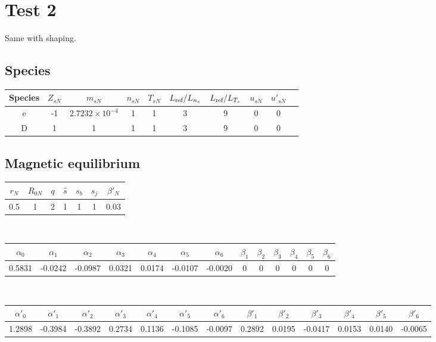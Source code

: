 \documentclass[fleqn]{report}
\begin{document}
\section{Test 2}
Same with shaping.

\subsection{Species}
\begin{tabular}{c c c c c c c c c c}
\hline
Species & $Z_{sN}$ & $m_{sN}$ & $n_{sN}$ & $T_{sN}$ & $L_{\textrm{ref}}/L_{n_s}$ & $L_{\textrm{ref}}/L_{T_s}$ & $u_{sN}$ & $u'_{sN}$ \\ [0.5ex]
\hline
e & -1 & $2.7232\times10^{-4}$ & 1 & 1 & 3 & 9 & 0 & 0 \\ [0.5ex]
\hline 
D &  1 & 1 & 1 & 1 & 3 & 9 & 0 & 0 \\ [0.5ex]
\hline
\end{tabular}

\subsection{Magnetic equilibrium}
\begin{tabular}{c c c c c c c}
\hline
$r_N$ & $R_{0N}$ & $q$ & $\hat{s}$ & $s_b$ & $s_j$ & $\beta'_N$ \\ [0.5ex]
\hline
0.5 & 1 & 2 & 1 & 1 & 1 & 0.03 \\
\hline
\end{tabular}\\
\begin{tabular}{c c c c c c c c c c c c c}
\hline
$\alpha_0$ & $\alpha_1$ & $\alpha_2$ & $\alpha_3$ & $\alpha_4$ & $\alpha_5$ & $\alpha_6$ 
& $\beta_1$ & $\beta_2$ & $\beta_3$ & $\beta_4$ & $\beta_5$ & $\beta_6$   \\ [0.5ex]
\hline
 0.5831 & -0.0242 & -0.0987 & 0.0321 & 0.0174 & -0.0107 & -0.0020 & 0 & 0 & 0 & 0 & 0 & 0 \\
\hline
\end{tabular}\\
\begin{tabular}{c c c c c c c c c c c c c}
\hline
$\alpha'_0$ & $\alpha'_1$ & $\alpha'_2$ & $\alpha'_3$ & $\alpha'_4$ & $\alpha'_5$ & $\alpha'_6$ 
& $\beta'_1$ & $\beta'_2$ & $\beta'_3$ & $\beta'_4$ & $\beta'_5$ & $\beta'_6$   \\ [0.5ex]
\hline
1.2898 & -0.3984 & -0.3892 & 0.2734 & 0.1136 & -0.1085  & -0.0097 & 0.2892 & 0.0195 & -0.0417  & 0.0153 & 0.0140 & -0.0065 \\
\hline
\end{tabular}
\end{document}
